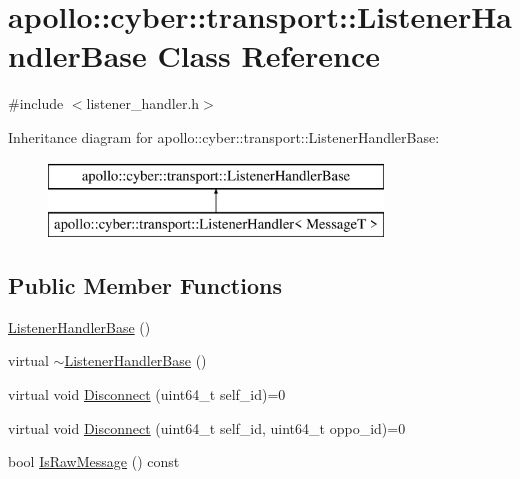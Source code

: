 \hypertarget{classapollo_1_1cyber_1_1transport_1_1ListenerHandlerBase}{\section{apollo\-:\-:cyber\-:\-:transport\-:\-:Listener\-Handler\-Base Class Reference}
\label{classapollo_1_1cyber_1_1transport_1_1ListenerHandlerBase}
}


{\ttfamily \#include $<$listener\-\_\-handler.\-h$>$}

Inheritance diagram for apollo\-:\-:cyber\-:\-:transport\-:\-:Listener\-Handler\-Base\-:\begin{figure}[H]
\begin{center}
\leavevmode
\includegraphics[height=2.000000cm]{classapollo_1_1cyber_1_1transport_1_1ListenerHandlerBase}
\end{center}
\end{figure}
\subsection*{Public Member Functions}
\begin{DoxyCompactItemize}
\item 
\hyperlink{classapollo_1_1cyber_1_1transport_1_1ListenerHandlerBase_a81d575ab9ccab7f0251c5af9d2d83fcb}{Listener\-Handler\-Base} ()
\item 
virtual \hyperlink{classapollo_1_1cyber_1_1transport_1_1ListenerHandlerBase_aa0b311470262f7c36de7e46abf1b1ac5}{$\sim$\-Listener\-Handler\-Base} ()
\item 
virtual void \hyperlink{classapollo_1_1cyber_1_1transport_1_1ListenerHandlerBase_ae66df407b61383d946788ff7a37e9b20}{Disconnect} (uint64\-\_\-t self\-\_\-id)=0
\item 
virtual void \hyperlink{classapollo_1_1cyber_1_1transport_1_1ListenerHandlerBase_afa2a7202373e5756b631d3f7dd325b09}{Disconnect} (uint64\-\_\-t self\-\_\-id, uint64\-\_\-t oppo\-\_\-id)=0
\item 
bool \hyperlink{classapollo_1_1cyber_1_1transport_1_1ListenerHandlerBase_a43cc98c3b19d658bae964432c0b75d41}{Is\-Raw\-Message} () const 
\end{DoxyCompactItemize}
